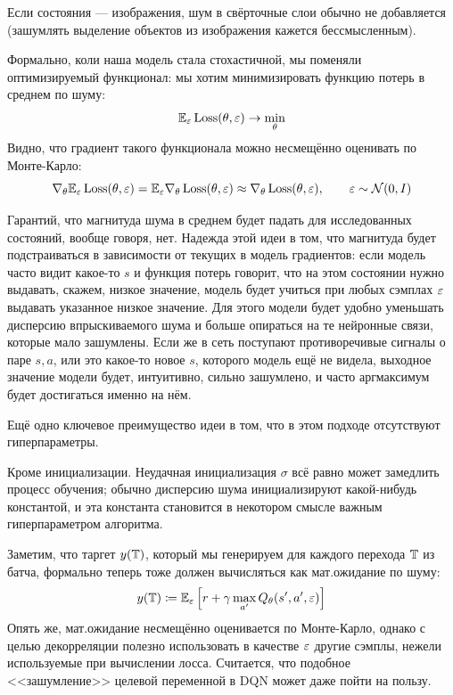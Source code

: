 \begin{remark}
Если состояния --- изображения, шум в свёрточные слои обычно не добавляется (зашумлять выделение объектов из изображения кажется бессмысленным).
\end{remark}

Формально, коли наша модель стала стохастичной, мы поменяли оптимизируемый функционал: мы хотим минимизировать функцию потерь в среднем по шуму:
$$\mathbb{E}_{\varepsilon} \operatorname{Loss}(\theta, \varepsilon) \to \min_\theta$$
Видно, что градиент такого функционала можно несмещённо оценивать по Монте-Карло:
$$\nabla_\theta \mathbb{E}_{\varepsilon} \operatorname{Loss}(\theta, \varepsilon) = \mathbb{E}_{\varepsilon} \nabla_\theta \operatorname{Loss}(\theta, \varepsilon) \approx \nabla_\theta \operatorname{Loss}(\theta, \varepsilon), \qquad \varepsilon \sim \mathcal{N}(0, I)$$

Гарантий, что магнитуда шума в среднем будет падать для исследованных состояний, вообще говоря, нет. Надежда этой идеи в том, что магнитуда будет подстраиваться в зависимости от текущих в модель градиентов: если модель часто видит какое-то $s$ и функция потерь говорит, что на этом состоянии нужно выдавать, скажем, низкое значение, модель будет учиться при любых сэмплах $\varepsilon$ выдавать указанное низкое значение. Для этого модели будет удобно уменьшать дисперсию впрыскиваемого шума и больше опираться на те нейронные связи, которые мало зашумлены. Если же в сеть поступают противоречивые сигналы о паре $s, a$, или это какое-то новое $s$, которого модель ещё не видела, выходное значение модели будет, интуитивно, сильно зашумлено, и часто аргмаксимум будет достигаться именно на нём. 

Ещё одно ключевое преимущество идеи в том, что в этом подходе отсутствуют гиперпараметры.

\begin{remark}
Кроме инициализации. Неудачная инициализация $\sigma$ всё равно может замедлить процесс обучения; обычно дисперсию шума инициализируют какой-нибудь константой, и эта константа становится в некотором смысле важным гиперпараметром алгоритма.
\end{remark}

Заметим, что таргет $y(\mathbb{T})$, который мы генерируем для каждого перехода $\mathbb{T}$ из батча, формально теперь тоже должен вычисляться как мат.ожидание по шуму:
$$y(\mathbb{T}) \coloneqq \mathbb{E}_\varepsilon \left[ r + \gamma \max_{a'} Q_{\theta}(s', a', \varepsilon) \right]$$
Опять же, мат.ожидание несмещённо оценивается по Монте-Карло, однако с целью декорреляции полезно использовать в качестве $\varepsilon$ другие сэмплы, нежели используемые при вычислении лосса. Считается, что подобное <<зашумление>> целевой переменной в DQN может даже пойти на пользу.

